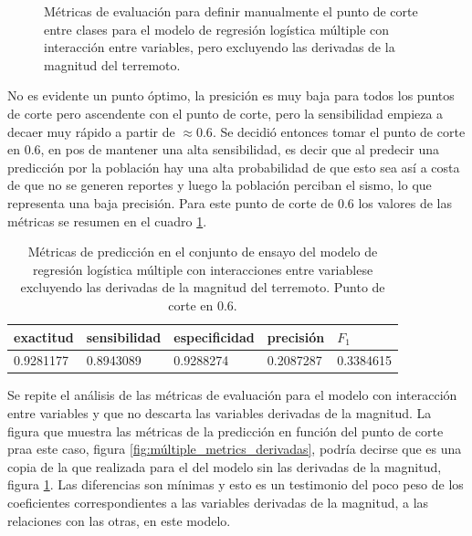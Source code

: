 \documentclass[a4paper]{report}
\begin{document}
\begin{figure}[!ht]
	\centering
	
	\vspace{-0.8cm}
	\caption{Métricas de evaluación para definir manualmente el punto de corte entre clases para el modelo de regresión logística múltiple con interacción entre variables, pero excluyendo las derivadas de la magnitud del terremoto.
	}
	\label{fig:múltiple_metrics}
\end{figure}

No es evidente un punto óptimo, la presición es muy baja para todos los puntos de corte pero ascendente con el punto de corte, pero la sensibilidad empieza a decaer muy rápido a partir de \(\approx 0.6\).
Se decidió entonces tomar el punto de corte en \num{0.6}, en pos de mantener una alta sensibilidad, es decir que al predecir una predicción por la población hay una alta probabilidad de que esto sea así a costa de que no se generen reportes y luego la población perciban el sismo, lo que representa una baja precisión.
Para este punto de corte de \num{0.6} los valores de las métricas se resumen en el cuadro \ref{tab:múltiple_metrics}.

\begin{table}[!ht]
	\centering
	\begin{tabular}{lllll}
	\toprule
	exactitud & sensibilidad & especificidad & precisión & \(F_1\) \\
	\midrule
	\num{0.9281177} & \num{0.8943089} & \num{0.9288274} & \num{0.2087287} & \num{0.3384615}\\
	\bottomrule
	\end{tabular}
	\caption{Métricas de predicción en el conjunto de ensayo del modelo de regresión logística múltiple con interacciones entre variablese excluyendo las derivadas de la magnitud del terremoto. Punto de corte en \num{0.6}.
	}
	\label{tab:múltiple_metrics}
\end{table}

Se repite el análisis de las métricas de evaluación para el modelo con interacción entre variables y que no descarta las variables derivadas de la magnitud.
La figura que muestra las métricas de la predicción en función del punto de corte praa este caso, figura \ref{fig:múltiple_metrics_derivadas}, podría decirse que es una copia de la que realizada para el del modelo sin las derivadas de la magnitud, figura \ref{fig:múltiple_metrics}.
Las diferencias son mínimas y esto es un testimonio del poco peso de los coeficientes correspondientes a las variables derivadas de la magnitud, a las relaciones con las otras, en este modelo. 
\end{document}
